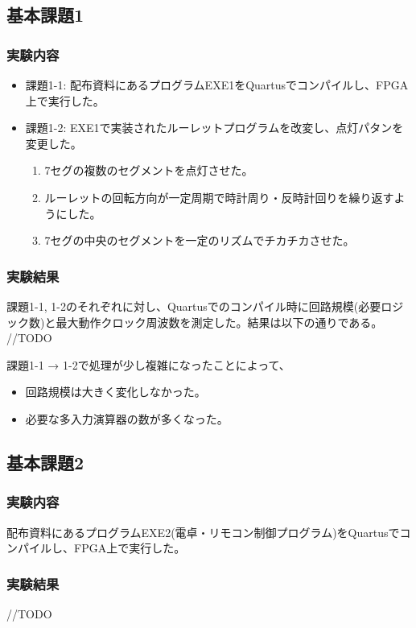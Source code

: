 \subsection*{基本課題1}
\subsubsection*{実験内容}
\begin{itemize}
    \item 課題1-1: 配布資料にあるプログラムEXE1をQuartusでコンパイルし、FPGA上で実行した。
    \item 課題1-2: EXE1で実装されたルーレットプログラムを改変し、点灯パタンを変更した。
    \begin{enumerate}
        \item 7セグの複数のセグメントを点灯させた。
        \item ルーレットの回転方向が一定周期で時計周り・反時計回りを繰り返すようにした。
        \item 7セグの中央のセグメントを一定のリズムでチカチカさせた。
    \end{enumerate}
\end{itemize}
\subsubsection*{実験結果}
課題1-1, 1-2のそれぞれに対し、Quartusでのコンパイル時に回路規模(必要ロジック数)と最大動作クロック周波数を測定した。結果は以下の通りである。
//TODO

課題1-1 → 1-2で処理が少し複雑になったことによって、
\begin{itemize}
    \item 回路規模は大きく変化しなかった。
    \item 必要な多入力演算器の数が多くなった。
\end{itemize}

\subsection*{基本課題2}
\subsubsection*{実験内容}
配布資料にあるプログラムEXE2(電卓・リモコン制御プログラム)をQuartusでコンパイルし、FPGA上で実行した。
\subsubsection*{実験結果}
//TODO
